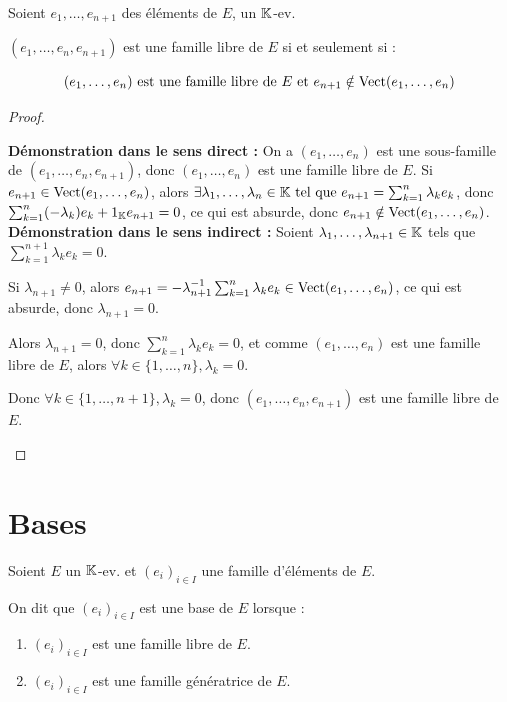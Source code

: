 \documentclass[12pt, a4paper]{report}
\begin{document}
\begin{theorem}
    Soient $e_1,\dots,e_{n+1}$ des éléments de $E$, un $\mathbb{K}$-ev.

    $(e_1,\dots,e_n,e_{n+1})$ est une famille libre de $E$ si et seulement si :
    
    $$(e_1,\dots,e_n) \text{ est une famille libre de } E \text{ et } e_{n+1} \notin \mathrm{Vect}(e_1,\dots,e_n)$$
    \label{thm:famille_libre_ajout_element}
\end{theorem}

\begin{proof}
    \begin{outline}
        \1 \textbf{Démonstration dans le sens direct :}
            \2 On a $(e_1,\dots,e_n)$ est une sous-famille de $(e_1,\dots,e_n,e_{n+1})$, donc $(e_1,\dots,e_n)$ est une famille libre de $E$.
            \2 Si $e_{n+1} \in \mathrm{Vect}(e_1,\dots,e_n)$, alors $\exists \lambda_1,\dots,\lambda_n \in \mathbb{K} \text{ tel que } e_{n+1} = \sum_{k=1}^n \lambda_k e_k$, donc $\sum_{k=1}^n (-\lambda_k) e_k + 1_{\mathbb{K}} e_{n+1} = 0$, ce qui est absurde, donc $e_{n+1} \notin \mathrm{Vect}(e_1,\dots,e_n)$.
        \1 \textbf{Démonstration dans le sens indirect :}
            \2 Soient $\lambda_1,\dots,\lambda_{n+1} \in \mathbb{K}$ tels que $\sum_{k=1}^{n+1} \lambda_k e_k = 0$.

            \2 Si $\lambda_{n+1} \ne 0$, alors $e_{n+1} = -\lambda_{n+1}^{-1} \sum_{k=1}^n \lambda_k e_k \in \mathrm{Vect}(e_1,\dots,e_n)$, ce qui est absurde, donc $\lambda_{n+1} = 0$.

            \2 Alors $\lambda_{n+1} = 0$, donc $\sum_{k=1}^n \lambda_k e_k = 0$, et comme $(e_1,\dots,e_n)$ est une famille libre de $E$, alors $\forall k \in \{1,\dots,n\}, \lambda_k = 0$.

            \2 Donc $\forall k \in \{1,\dots,n+1\}, \lambda_k = 0$, donc $(e_1,\dots,e_n,e_{n+1})$ est une famille libre de $E$.
    \end{outline}
\end{proof}

\section{Bases}

\begin{definition}
    Soient $E$ un $\mathbb{K}$-ev. et $(e_i)_{i \in I}$ une famille d'éléments de $E$.

    On dit que $(e_i)_{i \in I}$ est une base de $E$ lorsque :
    \begin{enumerate}
        \item $(e_i)_{i \in I}$ est une famille libre de $E$.
        \item $(e_i)_{i \in I}$ est une famille génératrice de $E$.
    \end{enumerate}
\end{definition}
\end{document}
